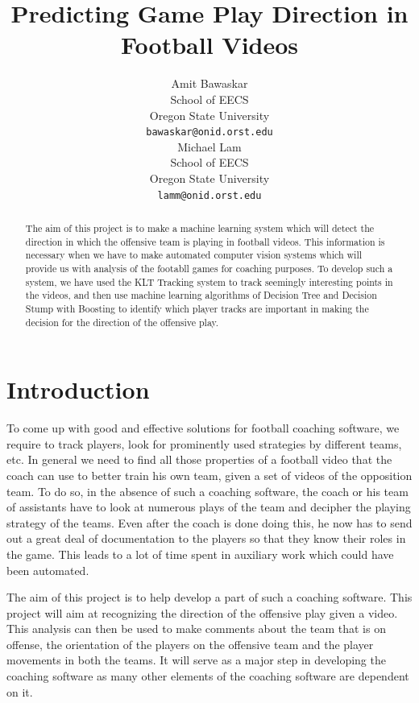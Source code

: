 \documentclass{article} %
\title{Predicting Game Play Direction in Football Videos}
\author{
Amit Bawaskar\\
School of EECS\\
Oregon State University\\
\texttt{bawaskar@onid.orst.edu} \\
\And
Michael Lam \\
School of EECS\\
Oregon State University \\
\texttt{lamm@onid.orst.edu} \\
}
\begin{document}
\maketitle

\begin{abstract}
The aim of this project is to make a machine learning system which will detect the direction in which the offensive team is playing in football videos. This information is necessary when we have to make automated computer vision systems which will provide us with analysis of the footabll games for coaching purposes. To develop such a system, we have used the KLT Tracking system to track seemingly interesting points in the videos, and then use machine learning algorithms of Decision Tree and Decision Stump with Boosting to identify which player tracks are important in making the decision for the direction of the offensive play. 
\end{abstract}

\section{Introduction}

To come up with good and effective solutions for football coaching software, we require to track players, look for prominently used strategies by different teams, etc. In general we need to find all those properties of a football video that the coach can use to better train his own team, given a set of videos of the opposition team. To do so, in the absence of such a coaching software, the coach or his team of assistants have to look at numerous plays of the team and decipher the playing strategy of the teams. Even after the coach is done doing this, he now has to send out a great deal of documentation to the players so that they know their roles in the game. This leads to a lot of time spent in auxiliary work which could have been automated. 

The aim of this project is to help develop a part of such a coaching software. This project will aim at recognizing the direction of the offensive play given a video. This analysis can then be used to make comments about the team that is on offense, the orientation of the players on the offensive team and the player movements in both the teams. It will serve as a major step in developing the coaching software as many other elements of the coaching software are dependent on it.
\end{document}
